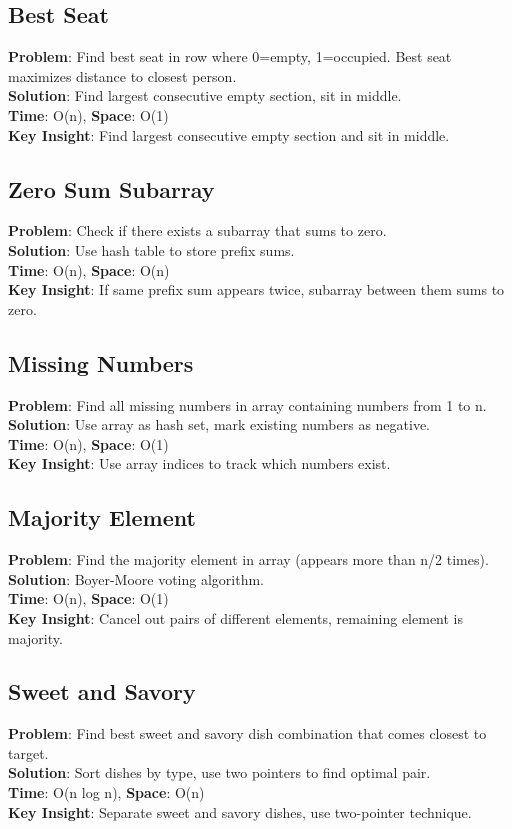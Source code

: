 \documentclass{report}
\begin{document}
\subsection{Best Seat}
\textbf{Problem}: Find best seat in row where 0=empty, 1=occupied. Best seat maximizes distance to closest person.\\
\textbf{Solution}: Find largest consecutive empty section, sit in middle.\\
\textbf{Time}: O(n), \textbf{Space}: O(1)\\
\textbf{Key Insight}: Find largest consecutive empty section and sit in middle.

\subsection{Zero Sum Subarray}
\textbf{Problem}: Check if there exists a subarray that sums to zero.\\
\textbf{Solution}: Use hash table to store prefix sums.\\
\textbf{Time}: O(n), \textbf{Space}: O(n)\\
\textbf{Key Insight}: If same prefix sum appears twice, subarray between them sums to zero.

\subsection{Missing Numbers}
\textbf{Problem}: Find all missing numbers in array containing numbers from 1 to n.\\
\textbf{Solution}: Use array as hash set, mark existing numbers as negative.\\
\textbf{Time}: O(n), \textbf{Space}: O(1)\\
\textbf{Key Insight}: Use array indices to track which numbers exist.

\subsection{Majority Element}
\textbf{Problem}: Find the majority element in array (appears more than n/2 times).\\
\textbf{Solution}: Boyer-Moore voting algorithm.\\
\textbf{Time}: O(n), \textbf{Space}: O(1)\\
\textbf{Key Insight}: Cancel out pairs of different elements, remaining element is majority.

\subsection{Sweet and Savory}
\textbf{Problem}: Find best sweet and savory dish combination that comes closest to target.\\
\textbf{Solution}: Sort dishes by type, use two pointers to find optimal pair.\\
\textbf{Time}: O(n log n), \textbf{Space}: O(n)\\
\textbf{Key Insight}: Separate sweet and savory dishes, use two-pointer technique.
\end{document}
